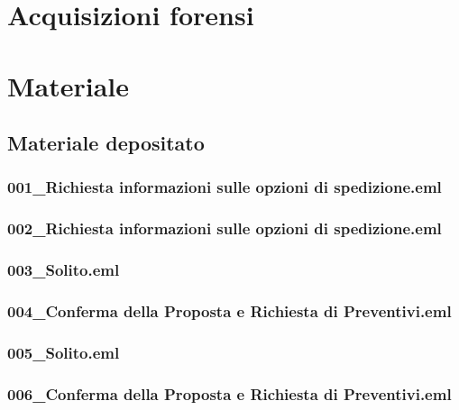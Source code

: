 \documentclass[a4paper,12pt]{report}
\begin{document}
\pagebreak

\chapter{Acquisizioni forensi}


\pagebreak

\chapter{Materiale}
\section{Materiale depositato}

\subsection{001\_Richiesta informazioni sulle opzioni di spedizione.eml}
\vspace{5pt}


\subsection{002\_Richiesta informazioni sulle opzioni di spedizione.eml}
\vspace{5pt}


\subsection{003\_Solito.eml}
\vspace{5pt}


\subsection{004\_Conferma della Proposta e Richiesta di Preventivi.eml}
\vspace{5pt}


\subsection{005\_Solito.eml}
\vspace{5pt}


\subsection{006\_Conferma della Proposta e Richiesta di Preventivi.eml}
\vspace{5pt}

\end{document}
